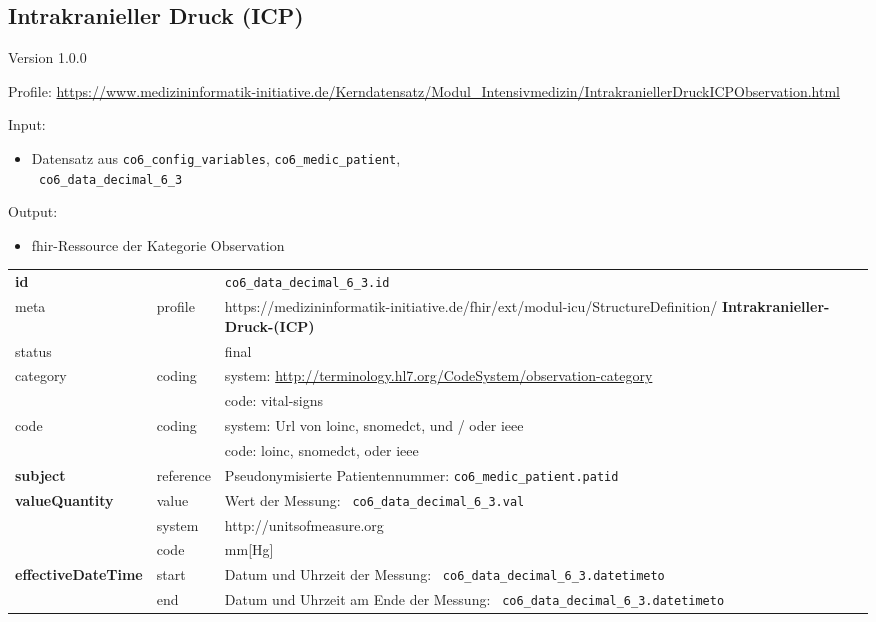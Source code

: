 \subsection{Intrakranieller Druck (ICP)} 
\noindent Version 1.0.0

\noindent Profile: \url{https://www.medizininformatik-initiative.de/Kerndatensatz/Modul_Intensivmedizin/IntrakraniellerDruckICPObservation.html}

\noindent Input:
\begin{itemize}
	\item Datensatz aus \texttt{co6\_config\_variables}, \texttt{co6\_medic\_patient}, \\ \texttt{
co6\_data\_decimal\_6\_3}
\end{itemize}
Output:
\begin{itemize}
        \item \ac{fhir}-Ressource der Kategorie \glqq Observation\grqq{}
\end{itemize}
\begin{longtable}{|l|l|p{7.5cm}|}
        \hline
        \rowcolor{lightgray} \multicolumn{3}{|l|}{Data Mapping (inhaltlich)} \\ \hline
        \textbf{id} &  & \texttt{co6\_data\_decimal\_6\_3.id} \\ \hline
	meta & profile & https://medizininformatik-initiative.de/fhir/ext/modul-icu/StructureDefinition/\textbf{
Intrakranieller-Druck-(ICP)} \\ \hline 
	status &  & final   \\ \hline 
	category & coding & system: \url{http://terminology.hl7.org/CodeSystem/observation-category} \\
\cline{3-3}
	& & code: vital-signs \\ \hline
	code & coding & system: Url von \ac{loinc}, \ac{snomedct}, und / oder \ac{ieee} \\ 
	\cline{3-3} 
	 &  & code: \ac{loinc}, \ac{snomedct}, oder \ac{ieee} \\ \hline
	 \textbf{subject}  & reference & Pseudonymisierte Patientennummer: \texttt{co6\_medic\_patient.patid} \\ \hline
	 \textbf{valueQuantity}  & value & Wert der Messung: \texttt{
co6\_data\_decimal\_6\_3.val} \\
        \cline{2-3}
         & system & http://unitsofmeasure.org \\
         \cline{2-3}
         & code & mm[Hg] \\ \hline
     \textbf{effectiveDateTime}  & start & Datum und Uhrzeit der Messung: \texttt{
co6\_data\_decimal\_6\_3.datetimeto} \\
    \cline{2-3}
     & end & Datum und Uhrzeit am Ende der Messung: \texttt{
co6\_data\_decimal\_6\_3.datetimeto} \\ \hline
\end{longtable}



